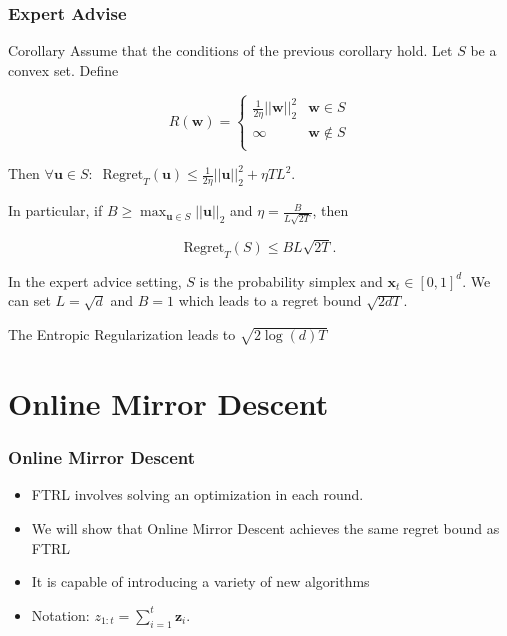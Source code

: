 \documentclass{beamer}
\newcommand{\uu}{\mathbf{u}}
\newcommand{\z}{\mathbf{z}}
\newcommand{\w}{\mathbf{w}}
\newcommand{\x}{\mathbf{x}}
\begin{document}
\begin{frame}
\frametitle{Expert Advise}

\begin{block}{Corollary}
Assume that the conditions of the previous corollary hold. Let $S$ be a convex set. Define

$$R(\w) = \begin{cases}
\frac{1}{2\eta}||\w||_2^2& \w \in S\\	\infty& \w \notin S\\
\end{cases}$$

Then 
$\forall \uu \in S:\;\; \mathrm{Regret}_T(\uu) \leq \frac{1}{2\eta}||\uu||_2^2 + \eta TL^2.$

In particular, if $B\geq \max_{\uu \in S} ||\uu||_2$ and $\eta = \frac{B}{L\sqrt{2T}}$, then

$$\mathrm{Regret}_T(S) \leq BL\sqrt{2T}.$$

\end{block}
\pause
In the expert advice setting,  $S$ is the probability simplex and $\x_t \in [0, 1]^d$. We can set $L = \sqrt{d}$ and $B = 1$ which leads to a regret bound $\sqrt{2dT}$.
\pause

The Entropic Regularization leads to $\sqrt{2\log(d)T}$
\end{frame}




\section{Online Mirror Descent}
\frame{\sectionpage}
\begin{frame}
\frametitle{Online Mirror Descent}
\begin{itemize}
\item FTRL involves solving an optimization in each round.
\item We will show that Online Mirror Descent achieves the same regret bound as FTRL

\item
It is capable of introducing a variety of new algorithms 

\item Notation: $z_{1:t} = \sum_{i = 1}^{t} \z_i$.

\end{itemize}
\end{frame}
\end{document}
